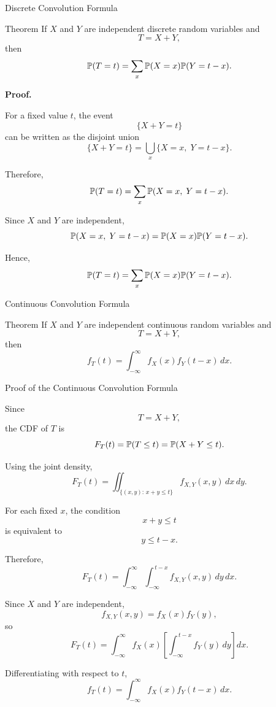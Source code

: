 \begin{frame}{Discrete Convolution Formula}

\begin{keybox}{Theorem}
If $X$ and $Y$ are independent discrete random variables and
\[
T=X+Y,
\]
then
\[
{
\mathbb{P}(T=t)
=
\sum_x
\mathbb{P}(X=x)\mathbb{P}(Y=t-x).
}
\]
\end{keybox}

\textbf{Proof.}

For a fixed value $t$, the event
\[
\{X+Y=t\}
\]
can be written as the disjoint union
\[
\{X+Y=t\}
=
\bigcup_x
\{X=x,\;Y=t-x\}.
\]

Therefore,
\[
\mathbb{P}(T=t)
=
\sum_x
\mathbb{P}(X=x,\;Y=t-x).
\]

Since $X$ and $Y$ are independent,
\[
\mathbb{P}(X=x,\;Y=t-x)
=
\mathbb{P}(X=x)\mathbb{P}(Y=t-x).
\]

Hence,
\[
{
\mathbb{P}(T=t)
=
\sum_x
\mathbb{P}(X=x)\mathbb{P}(Y=t-x).
}
\]

\end{frame}


\begin{frame}{Continuous Convolution Formula}

\begin{keybox}{Theorem}
If $X$ and $Y$ are independent continuous random variables and
\[
T=X+Y,
\]
then
\[
{
f_T(t)
=
\int_{-\infty}^{\infty}
f_X(x)f_Y(t-x)\,dx.
}
\]
\end{keybox}

\end{frame}








\begin{frame}{Proof of the Continuous Convolution Formula}

\small

Since
\[
T=X+Y,
\]
the CDF of $T$ is
\[
F_T(t)
=
\mathbb{P}(T\le t)
=
\mathbb{P}(X+Y\le t).
\]

Using the joint density,
\[
F_T(t)
=
\iint_{\{(x,y):\,x+y\le t\}}
f_{X,Y}(x,y)\,dx\,dy.
\]

For each fixed $x$, the condition
\[
x+y\le t
\]
is equivalent to
\[
y\le t-x.
\]

Therefore,
\[
F_T(t)
=
\int_{-\infty}^{\infty}
\int_{-\infty}^{\,t-x}
f_{X,Y}(x,y)\,dy\,dx.
\]

Since $X$ and $Y$ are independent,
\[
f_{X,Y}(x,y)=f_X(x)f_Y(y),
\]
so
\[
F_T(t)
=
\int_{-\infty}^{\infty}
f_X(x)
\left[
\int_{-\infty}^{\,t-x}
f_Y(y)\,dy
\right]dx.
\]

Differentiating with respect to $t$,
\[
{
f_T(t)
=
\int_{-\infty}^{\infty}
f_X(x)f_Y(t-x)\,dx.
}
\]

\end{frame}




